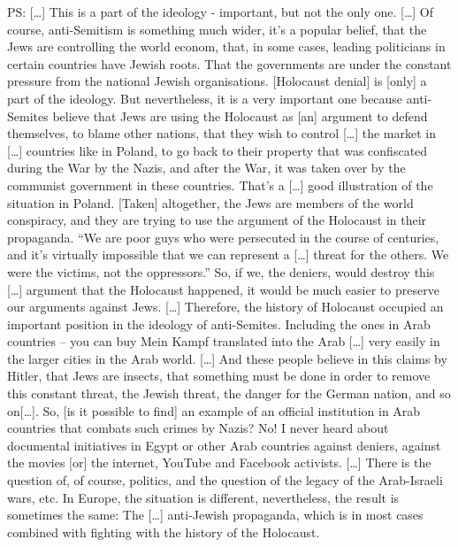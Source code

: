 PS: […] This is a part of the ideology - important, but not the only one. […] Of course, anti-Semitism is something much wider, it’s a popular belief, that the Jews are controlling the world econom, that, in some cases, leading politicians in certain countries have Jewish roots. That the governments are under the constant pressure from the national Jewish organisations. [Holocaust denial] is [only]  a part of the ideology. But nevertheless, it is a very important one because anti-Semites believe that Jews are using the Holocaust as [an] argument to defend themselves, to blame other nations, that they wish to control […] the market in […] countries like in Poland, to go back to their property that was confiscated during the War by the Nazis, and after the War, it was taken over by the communist government in these countries. That’s a […] good illustration of the situation in Poland. [Taken] altogether, the Jews are members of the world conspiracy, and they are trying to use the argument of the Holocaust in their propaganda. “We are poor guys who were persecuted in the course of centuries, and it’s virtually impossible that we can represent a […] threat for the others. We were the victims, not the oppressors.” So, if we, the deniers, would destroy this […] argument that the Holocaust happened, it would be much easier to preserve our arguments against Jews. […] Therefore, the history of Holocaust occupied an important position in the ideology of anti-Semites. Including the ones in Arab countries – you can buy Mein Kampf translated into the Arab […] very easily in the larger cities in the Arab world. […] And these people believe in this claims by Hitler, that Jews are insects, that something must be done in order to remove this constant threat, the Jewish threat, the danger for the German nation, and so on[…]. So, [is it possible to find] an example of an official institution in Arab countries that combats such crimes by Nazis? No! I never heard about documental initiatives in Egypt or other Arab countries against deniers, against the movies [or] the internet, YouTube and Facebook activists. […] There is the question of, of course, politics, and the question of the legacy of the Arab-Israeli wars, etc. In Europe, the situation is different, nevertheless, the result is sometimes the same: The […] anti-Jewish propaganda, which is in most cases combined with fighting with the history of the Holocaust. 
